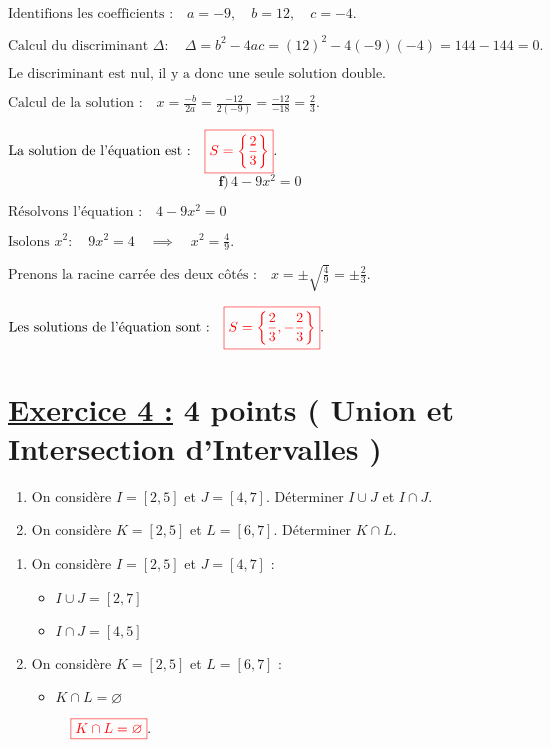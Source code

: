 \documentclass[12pt,a4paper]{article}
\begin{document}
\(
\text{Identifions les coefficients :} \quad a = -9, \quad b = 12, \quad c = -4.
\)

\(
\text{Calcul du discriminant } \Delta : \quad
\Delta = b^2 - 4ac = (12)^2 - 4(-9)(-4) = 144 - 144 = 0.
\)

\(
\text{Le discriminant est nul, il y a donc une seule solution double.}
\)

\(
\text{Calcul de la solution :} \quad
x = \frac{-b}{2a} = \frac{-12}{2(-9)} = \frac{-12}{-18} = \frac{2}{3}.
\)

\(
\text{La solution de l'équation est :} \quad
\textcolor{red}{\boxed{S=\left\lbrace  \frac{2}{3} \right\rbrace }}.
\)\\

\[ \textbf{f)} \, 4 - 9x^2 = 0 \]

\( \text{Résolvons l'équation :} \quad 4 - 9x^2 = 0 \)

\(
\text{Isolons } x^2 : \quad 9x^2 = 4 \quad \implies \quad x^2 = \frac{4}{9}.
\)

\(
\text{Prenons la racine carrée des deux côtés :} \quad x = \pm \sqrt{\frac{4}{9}} = \pm \frac{2}{3}.
\)

\(
\text{Les solutions de l'équation sont :} \quad
\textcolor{red}{\boxed{S=\left\lbrace  \frac{2}{3},-\frac{2}{3} \right\rbrace }}.
\)


\section*{\underline{Exercice 4 :} 4 points ( Union et Intersection d'Intervalles )}  

\begin{enumerate}  
\item On considère \( I = [2, 5] \) et \( J = [4, 7] \). Déterminer \( I \cup J \) et \( I \cap J \).  

\item On considère \( K = [2, 5] \) et \( L = [6, 7] \). Déterminer \( K \cap L \).  
\end{enumerate}

\begin{enumerate}
    \item On considère $I = [2, 5]$ et $J = [4, 7]$ :
    \begin{itemize}
        \item $I \cup J = [2, 7]$
        \item $I \cap J = [4, 5]$
    \end{itemize}

    \item On considère $K = [2, 5]$ et $L = [6, 7]$ :
    \begin{itemize}
        \item $K \cap L = \varnothing$
        
 \(
 \quad
\textcolor{red}{\boxed{K \cap L = \varnothing  }}.
\)
    \end{itemize}
\end{enumerate}
\end{document}
